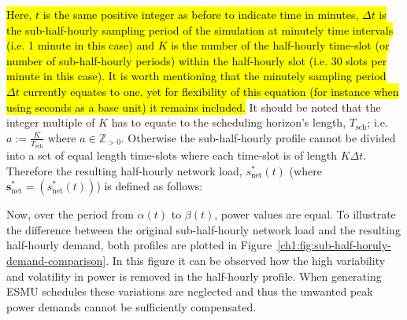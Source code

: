 


\hl{Here, $t$ is the same positive integer as before to indicate time in minutes, $\Delta t$ is the sub-half-hourly sampling period of the simulation at minutely time intervals (i.e. 1 minute in this case) and $K$ is the number of the half-hourly time-slot (or number of sub-half-hourly periods) within the half-hourly slot (i.e. 30 slots per minute in this case).
It is worth mentioning that the minutely sampling period $\Delta t$ currently equates to one, yet for flexibility of this equation (for instance when using seconds as a base unit) it remains included.}
It should be noted that the integer multiple of $K$ has to equate to the scheduling horizon's length, $T_\text{sch}$; i.e. $a := \frac{K}{T_\text{sch}} \text{ where } a \in \mathbb{Z}_{>0}$.
Otherwise the sub-half-hourly profile cannot be divided into a set of equal length time-slots where each time-slot is of length $K\Delta t$.
Therefore the resulting half-hourly network load, $s^{*}_\text{net}(t)$ (where $\textbf{s}^*_\text{net} = (s^*_\text{net}(t))$) is defined as follows:



Now, over the period from $\alpha(t)$ to $\beta(t)$, power values are equal.
To illustrate the difference between the original sub-half-hourly network load and the resulting half-hourly demand, both profiles are plotted in Figure~\ref{ch1:fig:sub-half-horuly-demand-comparison}.
In this figure it can be observed how the high variability and volatility in power is removed in the half-hourly profile.
When generating ESMU schedules these variations are neglected and thus the unwanted peak power demands cannot be sufficiently compensated.



